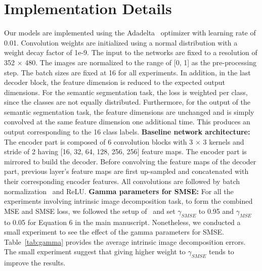 \documentclass[runningheads]{llncs}
\begin{document}
\section{Implementation Details}
Our models are implemented using the Adadelta~ optimizer with learning rate of 0.01. Convolution weights are initialized using a normal distribution with a weight decay factor of 1e-9. The input to the networks are fixed to a resolution of 352 $\times$ 480. The images are normalized to the range of [0, 1] as the pre-processing step. The batch sizes are fixed at 16 for all experiments. In addition, in the last decoder block, the feature dimension is reduced to the expected output dimensions. For the semantic segmentation task, the loss is weighted per class, since the classes are not equally distributed. Furthermore, for the output of the semantic segmentation task, the feature dimensions are unchanged and is simply convolved at the same feature dimension one additional time. This produces an output corresponding to the 16 class labels. 
\newline
\noindent \textbf{Baseline network architecture:} The encoder part is composed of 6 convolution blocks with 3 $\times$ 3 kernels and stride of 2 having [16, 32, 64, 128, 256, 256] feature maps. The encoder part is mirrored to build the decoder. Before convolving the feature maps of the decoder part, previous layer's feature maps are first up-sampled and concatenated with their corresponding encoder features. All convolutions are followed by batch normalization~ and ReLU.
\newline
\noindent \textbf{Gamma parameters for SMSE:} For all the experiments involving intrinsic image decomposition task, to form the combined MSE and SMSE loss, we followed the setup of~ and set $\gamma_{SMSE}$ to 0.95 and $\gamma_{MSE}$ to 0.05 for Equation 6 in the main manuscript. Nonetheless, we conducted a small experiment to see the effect of the gamma parameters for SMSE. Table~\ref{tab:gamma} provides the average intrinsic image decomposition errors. The small experiment suggest that giving higher weight to $\gamma_{SMSE}$ tends to improve the results.

\begin{table}[h]
  \centering
  \newline
  \caption{Effect of gamma parameters for SMSE}
  \label{tab:gamma}
\end{table}
\end{document}
